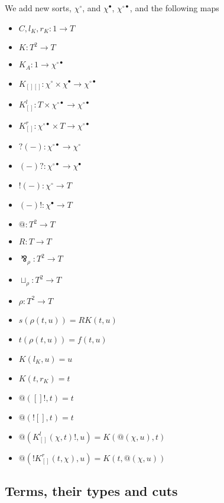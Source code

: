 \documentclass{llncs}
\renewcommand{\:}{\colon}
\begin{document}
We add new sorts, $\chi^{\circ}$, and $\chi^{\bullet}$, $\chi^{\circ\bullet}$, and the following maps

\begin{itemize}
  \item $C, l_{K}, r_{K} : 1 \rightarrow T$
  \item $K : T^{2} \rightarrow T$
  \item $K_{A} : 1 \rightarrow \chi^{\circ\bullet}$
  \item $K_{[][]} : \chi^{\circ} \times \chi^{\bullet} \rightarrow \chi^{\circ\bullet}$
  \item $K_{[]}^{l} : T \times \chi^{\circ\bullet} \rightarrow \chi^{\circ\bullet}$
  \item $K_{[]}^{r} :  \chi^{\circ\bullet} \times T \rightarrow\chi^{\circ\bullet}$
  \item $?(-) : \chi^{\circ\bullet}  \rightarrow \chi^{\circ}$
  \item $(-)? : \chi^{\circ\bullet}  \rightarrow \chi^{\bullet}$
  \item $!(-) : \chi^{\circ}  \rightarrow T$
  \item $(-)! : \chi^{\bullet}  \rightarrow T$
  \item $@ : T^{2} \rightarrow T$
  \item $R : T \rightarrow T$
  \item $\bindnasrepma_{\rho} : T^{2} \rightarrow T$
  \item $\sqcup_{\rho} : T^{2} \rightarrow T$
  \item $\rho : T^{2} \rightarrow T$             %
  \item $s(\rho(t,u)) = RK(t, u) $
  \item $t(\rho(t,u)) = f(t,u)$                      %
  \item $K(l_{K}, u) = u$
  \item $K(t, r_{K}) = t$
  \item $@([]!,t) = t$
  \item $@(![],t) = t$
  \item $@(K_{[]}^{l} (\chi, t)!, u) = K(@(\chi, u), t)$
  \item $@(!K_{[]}^{r} (t, \chi), u) = K(t, @(\chi, u))$
\end{itemize}

\subsection{Terms, their types and cuts}
\end{document}
